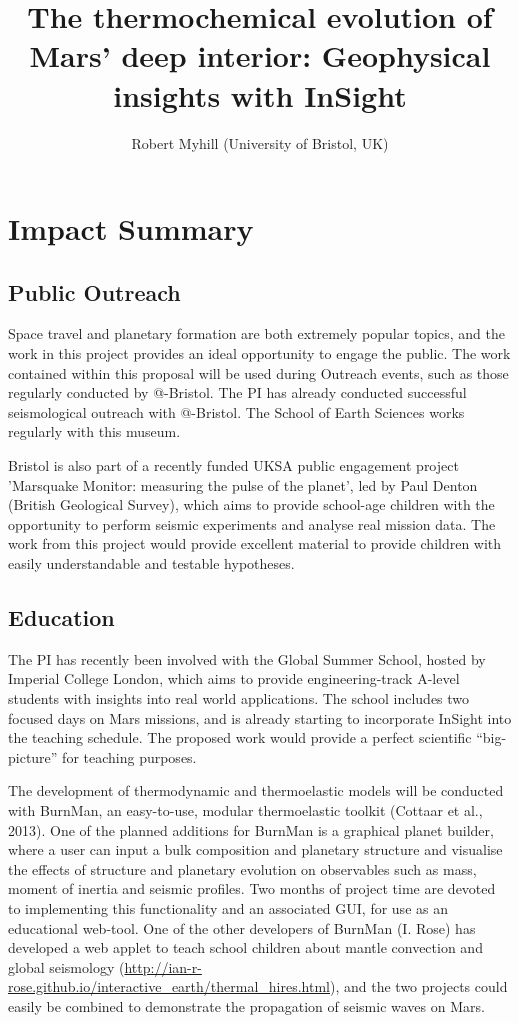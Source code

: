 \documentclass[11pt,twoside,a4paper]{article}
\date{}
\title{The thermochemical evolution of Mars' deep interior: Geophysical insights with InSight}
\author{Robert Myhill (University of Bristol, UK)}
\begin{document}
\section*{Impact Summary}


\subsection*{Public Outreach}

Space travel and planetary formation are both extremely popular topics, and the work in this project provides an ideal opportunity to engage the public. The work contained within this proposal will be used during Outreach events, such as those regularly conducted by @-Bristol. The PI has already conducted successful seismological outreach with @-Bristol. The School of Earth Sciences works regularly with this museum.

Bristol is also part of a recently funded UKSA public engagement project 'Marsquake Monitor: measuring the pulse of the planet', led by Paul Denton (British Geological Survey), which aims to provide school-age children with the opportunity to perform seismic experiments and analyse real mission data. The work from this project would provide excellent material to provide children with easily understandable and testable hypotheses.

\subsection*{Education}
The PI has recently been involved with the Global Summer School, hosted by Imperial College London, which aims to provide engineering-track A-level students with insights into real world applications. The school includes two focused days on Mars missions, and is already starting to incorporate InSight into the teaching schedule. The proposed work would provide a perfect scientific “big-picture” for teaching purposes.

The development of thermodynamic and thermoelastic models will be conducted with BurnMan, an easy-to-use, modular thermoelastic toolkit (Cottaar et al., 2013). One of the planned additions for BurnMan is a graphical planet builder, where a user can input a bulk composition and planetary structure and visualise the effects of structure and planetary evolution on observables such as mass, moment of inertia and seismic profiles. Two months of project time are devoted to implementing this functionality and an associated GUI, for use as an educational web-tool. One of the other developers of BurnMan (I. Rose) has developed a web applet to teach school children about mantle convection and global seismology (\url{http://ian-r-rose.github.io/interactive_earth/thermal_hires.html}), and the two projects could easily be combined to demonstrate the propagation of seismic waves on Mars.
\end{document}
